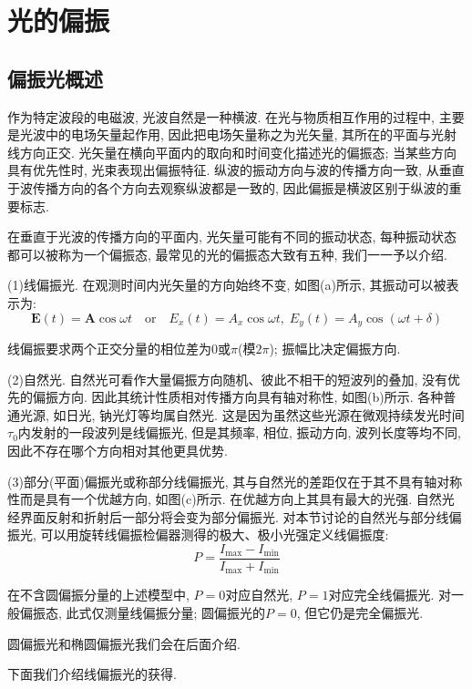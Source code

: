\graphicspath{{figure/chap4/}}
\chapter{光的偏振}
\section{偏振光概述}
作为特定波段的电磁波, 光波自然是一种横波. 在光与物质相互作用的过程中, 主要是光波中的电场矢量起作用, 因此把电场矢量称之为光矢量, 其所在的平面与光射线方向正交. 光矢量在横向平面内的取向和时间变化描述光的偏振态; 当某些方向具有优先性时, 光束表现出偏振特征. 纵波的振动方向与波的传播方向一致, 从垂直于波传播方向的各个方向去观察纵波都是一致的, 因此偏振是横波区别于纵波的重要标志.

在垂直于光波的传播方向的平面内, 光矢量可能有不同的振动状态, 每种振动状态都可以被称为一个偏振态, 最常见的光的偏振态大致有五种, 我们一一予以介绍.


(1)线偏振光. 在观测时间内光矢量的方向始终不变, 如图(a)所示, 其振动可以被表示为:
\[
\bm{E}(t) = \bm{A} \cos\omega t \quad \text{or} \quad E_x(t)=A_x\cos\omega t, \; E_y(t) = A_y\cos(\omega t+\delta)
\]

线偏振要求两个正交分量的相位差为$0$或$\pi$(模$2\pi$); 振幅比决定偏振方向.

(2)自然光. 自然光可看作大量偏振方向随机、彼此不相干的短波列的叠加, 没有优先的偏振方向. 因此其统计性质相对传播方向具有轴对称性, 如图(b)所示. 各种普通光源, 如日光, 钠光灯等均属自然光. 这是因为虽然这些光源在微观持续发光时间$\tau_0$内发射的一段波列是线偏振光, 但是其频率, 相位, 振动方向, 波列长度等均不同, 因此不存在哪个方向相对其他更具优势.

(3)部分(平面)偏振光或称部分线偏振光, 其与自然光的差距仅在于其不具有轴对称性而是具有一个优越方向, 如图(c)所示. 在优越方向上其具有最大的光强. 自然光经界面反射和折射后一部分将会变为部分偏振光. 对本节讨论的自然光与部分线偏振光, 可以用旋转线偏振检偏器测得的极大、极小光强定义线偏振度:
\[
P = \frac{I_{\max}-I_{\min}}{I_{\max}+I_{\min}}
\]

在不含圆偏振分量的上述模型中, $P=0$对应自然光, $P=1$对应完全线偏振光. 对一般偏振态, 此式仅测量线偏振分量; 圆偏振光的$P=0$, 但它仍是完全偏振光.

圆偏振光和椭圆偏振光我们会在后面介绍.

下面我们介绍线偏振光的获得.


